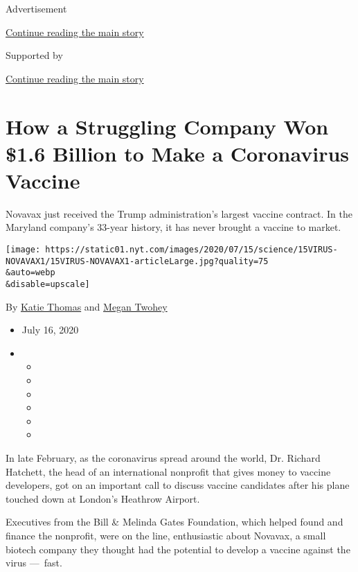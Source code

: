 Advertisement

\protect\hyperlink{after-top}{Continue reading the main story}

Supported by

\protect\hyperlink{after-sponsor}{Continue reading the main story}

\hypertarget{how-a-struggling-company-won-16-billion-to-make-a-coronavirus-vaccine}{%
\section{How a Struggling Company Won \$1.6 Billion to Make a
Coronavirus
Vaccine}\label{how-a-struggling-company-won-16-billion-to-make-a-coronavirus-vaccine}}

Novavax just received the Trump administration's largest vaccine
contract. In the Maryland company's 33-year history, it has never
brought a vaccine to market.

\texttt{[image: https://static01.nyt.com/images/2020/07/15/science/15VIRUS-NOVAVAX1/15VIRUS-NOVAVAX1-articleLarge.jpg?quality=75\\\&auto=webp\\\&disable=upscale]}

By \href{https://www.nytimes.com/by/katie-thomas}{Katie Thomas} and
\href{https://www.nytimes.com/by/megan-twohey}{Megan Twohey}

\begin{itemize}
\item
  July 16, 2020
\item
  \begin{itemize}
  \item
  \item
  \item
  \item
  \item
  \item
  \end{itemize}
\end{itemize}

In late February, as the coronavirus spread around the world, Dr.
Richard Hatchett, the head of an international nonprofit that gives
money to vaccine developers, got on an important call to discuss vaccine
candidates after his plane touched down at London's Heathrow Airport.

Executives from the Bill \& Melinda Gates Foundation, which helped found
and finance the nonprofit, were on the line, enthusiastic about Novavax,
a small biotech company they thought had the potential to develop a
vaccine against the virus ---~fast.

